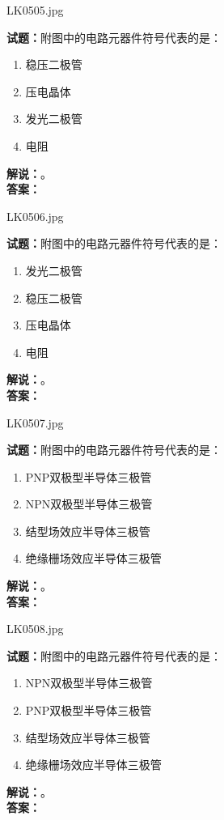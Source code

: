 \documentclass{ctexbook}
\begin{document}
LK0505.jpg


\noindent\textbf{试题：}附图中的电路元器件符号代表的是：
\begin{enumerate}[leftmargin=3em]
\item 稳压二极管
\item 压电晶体
\item 发光二极管
\item 电阻
\end{enumerate}
\noindent\textbf{解说：}\textbf{}。\\\noindent\textbf{答案：}

\bigskip

LK0506.jpg


\noindent\textbf{试题：}附图中的电路元器件符号代表的是：
\begin{enumerate}[leftmargin=3em]
\item 发光二极管
\item 稳压二极管
\item 压电晶体
\item 电阻
\end{enumerate}
\noindent\textbf{解说：}\textbf{}。\\\noindent\textbf{答案：}

\bigskip

LK0507.jpg


\noindent\textbf{试题：}附图中的电路元器件符号代表的是：
\begin{enumerate}[leftmargin=3em]
\item PNP双极型半导体三极管
\item NPN双极型半导体三极管
\item 结型场效应半导体三极管
\item 绝缘栅场效应半导体三极管
\end{enumerate}
\noindent\textbf{解说：}\textbf{}。\\\noindent\textbf{答案：}

\bigskip

LK0508.jpg


\noindent\textbf{试题：}附图中的电路元器件符号代表的是：
\begin{enumerate}[leftmargin=3em]
\item NPN双极型半导体三极管
\item PNP双极型半导体三极管
\item 结型场效应半导体三极管
\item 绝缘栅场效应半导体三极管
\end{enumerate}
\noindent\textbf{解说：}\textbf{}。\\\noindent\textbf{答案：}
\end{document}
